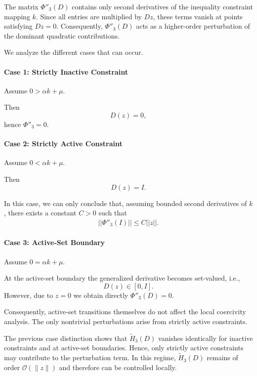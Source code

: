 \documentclass[11pt]{article}
\begin{document}
The matrix $\Phi''_{3}(D)$ contains only second derivatives
of the inequality constraint mapping $k$. Since all entries are multiplied by $Dz$, these terms vanish at points satisfying $Dz=0$. Consequently, $\Phi''_{3}(D)$ acts as a higher-order perturbation of the dominant quadratic contributions.

We analyze the different cases that can occur. 

\paragraph{Case 1: Strictly Inactive Constraint}
Assume
$
0>\alpha k+\mu.
$

Then
\[
D(z)=0,
\]
hence $\Phi''_3=0$. 

\paragraph{Case 2: Strictly Active Constraint}

Assume
$
0<\alpha k+\mu.
$

Then
\[
D(z)=I.
\]

In this case, we can only conclude that, assuming bounded second derivatives of $k$, there exists
a constant $C>0$ such that
\begin{align*}
    ||\Phi''_3(I)||\leq C ||z||.
\end{align*}

\paragraph{Case 3: Active-Set Boundary}

Assume
$
0=\alpha k+\mu.
$

At the active-set boundary the generalized derivative becomes set-valued, i.e., 
\[
D(z)\in[0,I].
\]
However, due to $z=0$ we obtain directly $\Phi''_3(D)=0.$

Consequently, active-set transitions themselves do not affect the local coercivity analysis. The only nontrivial perturbations arise from strictly active constraints.

The previous case distinction shows that
$\tilde H_3(D)$ vanishes identically for inactive constraints and at active-set boundaries. Hence, only strictly active constraints may contribute to the perturbation term. In this regime,
$\tilde H_3(D)$ remains of order $\mathcal O(\|z\|)$ and therefore can be controlled locally.

\end{document}
